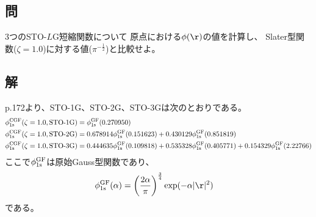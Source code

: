 \subsection{問}
3つのSTO-$L$G短縮関数について
原点における$\phi(\r)$の値を計算し、
Slater型関数($\zeta=1.0$)に対する値($\pi^{-\frac{1}{2}}$)と比較せよ。


\subsection{解}
p.172より、STO-1G、STO-2G、STO-3Gは次のとおりである。
\begin{align}
	\phi^{\rm CGF}_{\rm 1s}(\zeta=1.0,\text{STO-1G})
&=
	\phi^{\rm GF}_{\rm 1s}(0.270950) \\
%
%
	\phi^{\rm CGF}_{\rm 1s}(\zeta=1.0,\text{STO-2G})
&=
	0.678914
	\phi^{\rm GF}_{\rm 1s}(0.151623)
	+
	0.430129
	\phi^{\rm GF}_{\rm 1s}(0.851819) \\
%
%
	\phi^{\rm CGF}_{\rm 1s}(\zeta=1.0,\text{STO-3G})
&=
	0.444635
	\phi^{\rm GF}_{\rm 1s}(0.109818)
	+
	0.535328
	\phi^{\rm GF}_{\rm 1s}(0.405771)
	+
	0.154329
	\phi^{\rm GF}_{\rm 1s}(2.22766)
\end{align}
ここで$\phi^{\rm GF}_{\rm 1s}$は原始Gauss型関数であり、
\begin{align}
	\phi^{\rm GF}_{\rm 1s}(\alpha)
&=
	\left(
		\frac{2\alpha}{\pi}
	\right)^{\frac{3}{4}}
	\exp(-\alpha|\r|^2)
\end{align}
である。
